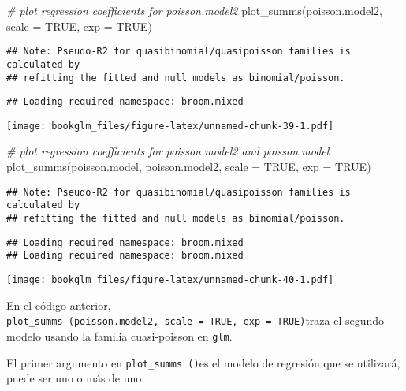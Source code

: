 \documentclass[
]{book}
\newenvironment{Shaded}{\begin{snugshade}}{\end{snugshade}}
\newcommand{\AttributeTok}[1]{\textcolor[rgb]{0.77,0.63,0.00}{#1}}
\newcommand{\CommentTok}[1]{\textcolor[rgb]{0.56,0.35,0.01}{\textit{#1}}}
\newcommand{\ConstantTok}[1]{\textcolor[rgb]{0.00,0.00,0.00}{#1}}
\newcommand{\FunctionTok}[1]{\textcolor[rgb]{0.00,0.00,0.00}{#1}}
\newcommand{\NormalTok}[1]{#1}
\begin{document}
\begin{Shaded}
\begin{Highlighting}[]
\CommentTok{\# plot regression coefficients for poisson.model2}
\FunctionTok{plot\_summs}\NormalTok{(poisson.model2, }\AttributeTok{scale =} \ConstantTok{TRUE}\NormalTok{, }\AttributeTok{exp =} \ConstantTok{TRUE}\NormalTok{)}
\end{Highlighting}
\end{Shaded}

\begin{verbatim}
## Note: Pseudo-R2 for quasibinomial/quasipoisson families is calculated by
## refitting the fitted and null models as binomial/poisson.
\end{verbatim}

\begin{verbatim}
## Loading required namespace: broom.mixed
\end{verbatim}

\texttt{[image: bookglm\_files/figure-latex/unnamed-chunk-39-1.pdf]}

\begin{Shaded}
\begin{Highlighting}[]
\CommentTok{\# plot regression coefficients for poisson.model2 and poisson.model}
\FunctionTok{plot\_summs}\NormalTok{(poisson.model, poisson.model2, }\AttributeTok{scale =} \ConstantTok{TRUE}\NormalTok{, }\AttributeTok{exp =} \ConstantTok{TRUE}\NormalTok{)}
\end{Highlighting}
\end{Shaded}

\begin{verbatim}
## Note: Pseudo-R2 for quasibinomial/quasipoisson families is calculated by
## refitting the fitted and null models as binomial/poisson.
\end{verbatim}

\begin{verbatim}
## Loading required namespace: broom.mixed
## Loading required namespace: broom.mixed
\end{verbatim}

\texttt{[image: bookglm\_files/figure-latex/unnamed-chunk-40-1.pdf]}

En el código anterior, \texttt{plot\_summs\ (poisson.model2,\ scale\ =\ TRUE,\ exp\ =\ TRUE)}traza el segundo modelo usando la familia cuasi-poisson en \texttt{glm}.

El primer argumento en \texttt{plot\_summs\ ()}es el modelo de regresión que se utilizará, puede ser uno o más de uno.
\end{document}
